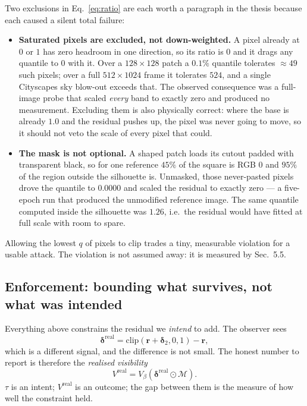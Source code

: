 \documentclass[11pt,a4paper]{article}
\begin{document}
Two exclusions in Eq.~\eqref{eq:ratio} are each worth a paragraph in the
thesis because each caused a silent total failure:
\begin{itemize}
\item \textbf{Saturated pixels are excluded, not down-weighted.} A pixel
  already at $0$ or $1$ has zero headroom in one direction, so its ratio is
  $0$ and it drags any quantile to $0$ with it. Over a $128\times128$ patch
  a $0.1\%$ quantile tolerates $\approx49$ such pixels; over a full
  $512\times1024$ frame it tolerates $524$, and a single Cityscapes sky
  blow-out exceeds that. The observed consequence was a full-image probe
  that scaled \emph{every} band to exactly zero and produced no measurement.
  Excluding them is also physically correct: where the base is already $1.0$
  and the residual pushes up, the pixel was never going to move, so it
  should not veto the scale of every pixel that could.
\item \textbf{The mask is not optional.} A shaped patch loads its cutout
  padded with transparent black, so for one reference $45\%$ of the square
  is RGB $0$ and $95\%$ of the region outside the silhouette is. Unmasked,
  those never-pasted pixels drove the quantile to $0.0000$ and scaled the
  residual to exactly zero --- a five-epoch run that produced the unmodified
  reference image. The same quantile computed inside the silhouette was
  $1.26$, i.e.\ the residual would have fitted at full scale with room to
  spare.
\end{itemize}
Allowing the lowest $q$ of pixels to clip trades a tiny, measurable
violation for a usable attack. The violation is not assumed away: it is
measured by Sec.~5.5.

\subsection{Enforcement: bounding what survives, not what was intended}
\label{sec:enforce}

Everything above constrains the residual we \emph{intend} to add. The
observer sees
\begin{equation}
  \boldsymbol{\delta}^{\mathrm{real}}
  = \mathrm{clip}(\mathbf{r}+\boldsymbol{\delta}_2,0,1) - \mathbf{r},
  \label{eq:realresid}
\end{equation}
which is a different signal, and the difference is not small. The honest
number to report is therefore the \emph{realised visibility}
\begin{equation}
  V^{\mathrm{real}}
  = V_\beta\!\left(\boldsymbol{\delta}^{\mathrm{real}}\odot\mathcal{M}\right).
  \label{eq:realvis}
\end{equation}
$\tau$ is an intent; $V^{\mathrm{real}}$ is an outcome; the gap between them
is the measure of how well the constraint held.
\end{document}
